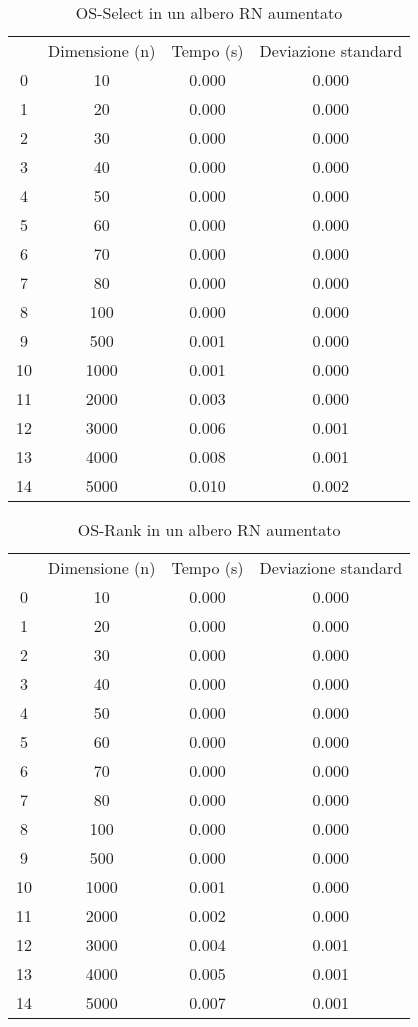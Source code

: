 \begin{table}[H]
\centering
\caption{OS-Select in un albero RN aumentato}
\label{OS-Select in un albero RN aumentato}
\begin{tabular}{cccc}
 & Dimensione (n) & Tempo (s) & Deviazione standard \\
0 & 10 & 0.000 & 0.000 \\
\cline{1-4}
1 & 20 & 0.000 & 0.000 \\
\cline{1-4}
2 & 30 & 0.000 & 0.000 \\
\cline{1-4}
3 & 40 & 0.000 & 0.000 \\
\cline{1-4}
4 & 50 & 0.000 & 0.000 \\
\cline{1-4}
5 & 60 & 0.000 & 0.000 \\
\cline{1-4}
6 & 70 & 0.000 & 0.000 \\
\cline{1-4}
7 & 80 & 0.000 & 0.000 \\
\cline{1-4}
8 & 100 & 0.000 & 0.000 \\
\cline{1-4}
9 & 500 & 0.001 & 0.000 \\
\cline{1-4}
10 & 1000 & 0.001 & 0.000 \\
\cline{1-4}
11 & 2000 & 0.003 & 0.000 \\
\cline{1-4}
12 & 3000 & 0.006 & 0.001 \\
\cline{1-4}
13 & 4000 & 0.008 & 0.001 \\
\cline{1-4}
14 & 5000 & 0.010 & 0.002 \\
\cline{1-4}
\end{tabular}
\end{table}

\begin{table}[H]
\centering
\caption{OS-Rank in un albero RN aumentato}
\label{OS-Rank in un albero RN aumentato}
\begin{tabular}{cccc}
 & Dimensione (n) & Tempo (s) & Deviazione standard \\
0 & 10 & 0.000 & 0.000 \\
\cline{1-4}
1 & 20 & 0.000 & 0.000 \\
\cline{1-4}
2 & 30 & 0.000 & 0.000 \\
\cline{1-4}
3 & 40 & 0.000 & 0.000 \\
\cline{1-4}
4 & 50 & 0.000 & 0.000 \\
\cline{1-4}
5 & 60 & 0.000 & 0.000 \\
\cline{1-4}
6 & 70 & 0.000 & 0.000 \\
\cline{1-4}
7 & 80 & 0.000 & 0.000 \\
\cline{1-4}
8 & 100 & 0.000 & 0.000 \\
\cline{1-4}
9 & 500 & 0.000 & 0.000 \\
\cline{1-4}
10 & 1000 & 0.001 & 0.000 \\
\cline{1-4}
11 & 2000 & 0.002 & 0.000 \\
\cline{1-4}
12 & 3000 & 0.004 & 0.001 \\
\cline{1-4}
13 & 4000 & 0.005 & 0.001 \\
\cline{1-4}
14 & 5000 & 0.007 & 0.001 \\
\cline{1-4}
\end{tabular}
\end{table}
